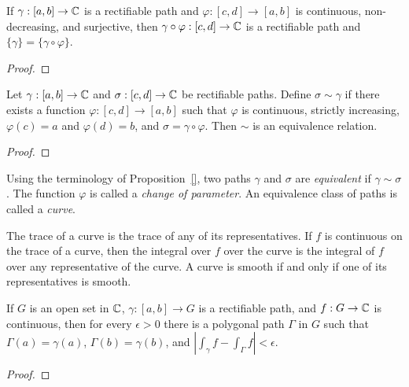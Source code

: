 \begin{lemma}
	If $\gamma:[a,b] \rightarrow \mathbb{C}$ is a rectifiable path and $\varphi:[c,d] \rightarrow [a,b]$ is continuous, non-decreasing, and surjective, then $\gamma \circ \varphi : [c,d] \rightarrow \mathbb{C}$ is a rectifiable path and $\{\gamma\} = \{\gamma \circ \varphi\}$.
\end{lemma}
{\color{red}
\begin{proof}
		
\end{proof}}

\begin{proposition}
	Let $\gamma:[a,b] \rightarrow \mathbb{C}$ and $\sigma:[c,d] \rightarrow \mathbb{C}$ be rectifiable paths. Define $\sigma \sim \gamma$ if there exists a function $\varphi:[c,d] \rightarrow [a,b]$ such that $\varphi$ is continuous, strictly increasing, $\varphi(c) = a$ and $\varphi(d) = b$, and $\sigma = \gamma \circ \varphi$. Then $\sim$ is an equivalence relation.
\end{proposition}
{\color{red}
\begin{proof}
		
\end{proof}}

\begin{definition}
	Using the terminology of Proposition~\ref{}, two paths $\gamma$ and $\sigma$ are \emph{equivalent} if $\gamma \sim \sigma$. The function $\varphi$ is called a \emph{change of parameter}. An equivalence class of paths is called a \emph{curve}.
\end{definition}

\begin{remark}
	The trace of a curve is the trace of any of its representatives. If $f$ is continuous on the trace of a curve, then the integral over $f$ over the curve is the integral of $f$ over any representative of the curve. A curve is smooth if and only if one of its representatives is smooth. 
\end{remark}

\begin{lemma}
	If $G$ is an open set in $\mathbb{C}$, $\gamma:[a,b] \rightarrow G$ is a rectifiable path, and $f:G \rightarrow \mathbb{C}$ is continuous, then for every $\epsilon > 0$ there is a polygonal path $\Gamma$ in $G$ such that $\Gamma(a) = \gamma(a)$, $\Gamma(b) = \gamma(b)$, and $\left| \int_{\gamma}^{} f - \int_{\Gamma}^{} f \right| < \epsilon$. 
\end{lemma}
{\color{red}
\begin{proof}
		
\end{proof}}

